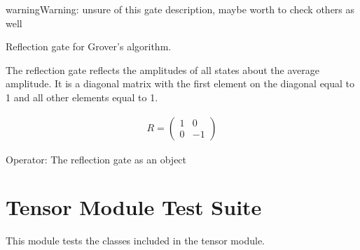\documentclass[letterpaper,10pt,english]{sphinxmanual}
\begin{document}
\begin{fulllineitems}
\begin{fulllineitems}
\begin{description}
\end{description}

\begin{sphinxadmonition}{warning}{Warning:}
\sphinxAtStartPar
unsure of this gate description, maybe worth to check others as well
\end{sphinxadmonition}

\end{fulllineitems}


\begin{fulllineitems}
\label{\detokenize{index:gates.Gate.reflection}}
\pysigstartsignatures
{}
\pysigstopsignatures
\sphinxAtStartPar
Reflection gate for Grover’s algorithm.

\sphinxAtStartPar
The reflection gate reflects the amplitudes of all states about the average
amplitude. It is a diagonal matrix with the first element on the diagonal
equal to 1 and all other elements equal to \sphinxhyphen{}1.

\sphinxAtStartPar
{}
\begin{equation*}
\begin{split}R = 
    \begin{pmatrix}
        1 & 0 \\
        0 & -1
    \end{pmatrix}\end{split}
\end{equation*}\begin{description}
\sphinxAtStartPar
Operator: The reflection gate as an  object

\end{description}

\end{fulllineitems}


\end{fulllineitems}


\chapter{Tensor Module Test Suite}
\label{\detokenize{index:tensor-module-test-suite}}\label{\detokenize{index:module-tests.test_tensor}}
\sphinxAtStartPar
This module tests the classes included in the tensor module.
\end{document}
